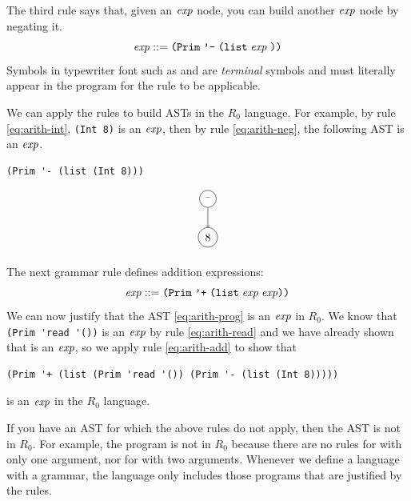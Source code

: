 \documentclass[11pt]{book}
\begin{document}
The third rule says that, given an $\mathit{exp}$ node, you can build another
$\mathit{exp}$ node by negating it.
\begin{equation}
  \mathit{exp} ::= \texttt{(Prim}\;\texttt{'-}\;\texttt{(list}\;\mathit{exp}\;\texttt{))}  \label{eq:arith-neg}
\end{equation}
Symbols in typewriter font such as \key{-} and  are
\emph{terminal} symbols and must literally appear in the program for
the rule to be applicable.

We can apply the rules to build ASTs in the $R_0$
language. For example, by rule \eqref{eq:arith-int}, \texttt{(Int 8)} is an
$\mathit{exp}$, then by rule \eqref{eq:arith-neg}, the following AST is
an $\mathit{exp}$.
\begin{center}
\begin{minipage}{0.4\textwidth}
\begin{lstlisting}
(Prim '- (list (Int 8)))
\end{lstlisting}
\end{minipage}
\begin{minipage}{0.25\textwidth}
\begin{equation}
\begin{tikzpicture}
 \node[draw, circle] (minus) at (0, 0)  {$\text{--}$};
 \node[draw, circle] (8)     at (0, -1.2) {$8$};

 \draw[->] (minus) to (8);
\end{tikzpicture}
\label{eq:arith-neg8}
\end{equation}
\end{minipage}
\end{center}

The next grammar rule defines addition expressions:
\begin{equation}
  \mathit{exp} ::= \texttt{(Prim}\;\texttt{'+}\;\texttt{(list}\;\mathit{exp}\;\mathit{exp}\texttt{))} \label{eq:arith-add}
\end{equation}
We can now justify that the AST \eqref{eq:arith-prog} is an $\mathit{exp}$ in
$R_0$.  We know that \lstinline{(Prim 'read '())} is an $\mathit{exp}$ by rule
\eqref{eq:arith-read} and we have already shown that  is an $\mathit{exp}$, so we apply rule \eqref{eq:arith-add}
to show that
\begin{lstlisting}
(Prim '+ (list (Prim 'read '()) (Prim '- (list (Int 8)))))
\end{lstlisting}
is an $\mathit{exp}$ in the $R_0$ language.

If you have an AST for which the above rules do not apply, then the
AST is not in $R_0$. For example, the program 
is not in $R_0$ because there are no rules for \code{+} with only one
argument, nor for \key{-} with two arguments. Whenever we define a
language with a grammar, the language only includes those programs
that are justified by the rules.
\end{document}
